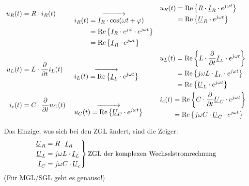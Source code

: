 \begin{itemize}
    \begin{align*}
      u_R(t) &= R\cdot i_R(t) 
      &&\underset{
        \begin{aligned}
          i_R(t)
            &= I_R\cdot\cos(\omega t+\varphi)  \\
            &= \operatorname{Re}\left\{I_R\cdot e^{j\varphi}\cdot e^{j\omega t}\right\}  \\
            &= \operatorname{Re}\left\{\underline{I}_R\cdot e^{j\omega t}\right\}
        \end{aligned}
      }{\xrightarrow{\hspace{1cm}}}
      &&\begin{aligned}
        u_R(t)
          &= \operatorname{Re}\left\{R\cdot \underline{I}_R\cdot e^{j\omega t}\right\} \\
          &= \operatorname{Re}\left\{\underline{U}_R\cdot e^{j\omega t}\right\}
      \end{aligned} \\
      u_L(t) &= L\cdot \frac{\partial}{\partial t}i_L(t) 
      &&\underset{
        \begin{aligned}
          i_L(t) = \operatorname{Re}\left\{\underline{I}_L\cdot e^{j\omega t}\right\}
        \end{aligned}}
        {\xrightarrow{\hspace{1cm}}}
      &&\begin{aligned}
          u_L(t)
            &= \operatorname{Re}\left\{L\cdot \frac{\partial}{\partial t} \underline{I}_L
              \cdot e^{j\omega t}\right\}  \\
            &= \operatorname{Re}\left\{j\omega L\cdot\underline{I}_L\cdot e^{j\omega t}\right\} \\
            &= \operatorname{Re}\left\{\underline{U}_L\cdot e^{j\omega t}\right\}
        \end{aligned} \\
      i_c(t) &= C\cdot \frac{\partial}{\partial t} u_C(t)
      &&\underset{
        \begin{aligned}
          u_C(t) = \operatorname{Re}\left\{\underline{U}_C\cdot e^{j\omega t}\right\}
        \end{aligned}}
        {\xrightarrow{\hspace{1cm}}}
      &&\begin{aligned}
          i_c(t)
            &= \operatorname{Re}\left\{C\cdot \frac{\partial}{\partial t}\underline{U}_C
              \cdot e^{j\omega t}\right\}  \\
            &= \operatorname{Re}\left\{j\omega C\cdot \underline{U}_C\cdot e^{j\omega t}\right\}
        \end{aligned}
    \end{align*}

    Das Einzige, was sich bei den \acs{ZGL} ändert, sind die Zeiger:
    \[\left.
      \begin{aligned}
        \underline{U}_R &= R\cdot \underline{I}_R  \\
        \underline{U}_L &= j\omega L\cdot \underline{I}_L  \\
        \underline{I}_C &= j\omega C\cdot \underline{U}_c
      \end{aligned}
      \right\}\text{ZGL der komplexen Wechselstromrechnung}\]
    (Für MGL/SGL geht es genauso!)
\end{itemize}

